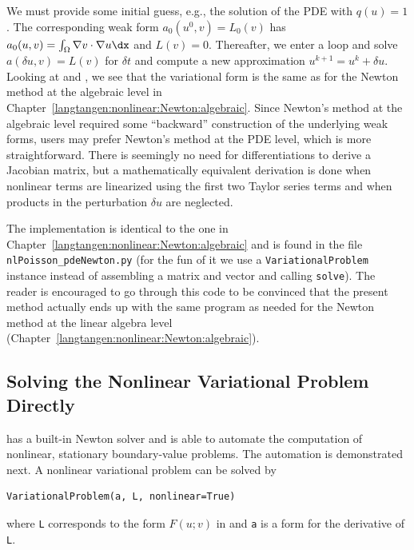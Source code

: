 We must provide some initial guess, e.g., the solution of the
PDE with $q(u)=1$. The corresponding weak form $a_0(u^0,v)=L_0(v)$
has $a_0(u,v)=\int_\Omega\nabla v\cdot\nabla u\dx$
and $L(v)=0$. Thereafter, we enter a loop and solve
$a(\delta u,v)=L(v)$ for $\delta t$ and compute a new approximation
$u^{k+1} = u^k + \delta u$.
Looking at  and
, we see that the variational
form is the same as for the Newton method at the algebraic level
in Chapter~\ref{langtangen:nonlinear:Newton:algebraic}. Since Newton's method
at the algebraic level required some ``backward'' construction of the
underlying weak forms, \fenics{} users may prefer Newton's method at
the PDE level, which is more straightforward.
There is seemingly no need for differentiations to derive
a Jacobian matrix,
but a mathematically equivalent derivation is done when nonlinear terms are
linearized using the first two Taylor series terms and when
products in the perturbation $\delta u$ are neglected.

The implementation is identical to the one in
Chapter~\ref{langtangen:nonlinear:Newton:algebraic} and is found in
the file {\fontsize{12pt}{12pt}\verb!nlPoisson_pdeNewton.py!} (for the fun of it we use
a {\fontsize{12pt}{12pt}\texttt{VariationalProblem}} instance instead of assembling a matrix and
vector and calling {\fontsize{12pt}{12pt}\texttt{solve}}). The reader is encouraged to go
through this code to be convinced that the present method actually
ends up with the same program as needed for the Newton method at
the linear algebra level (Chapter~\ref{langtangen:nonlinear:Newton:algebraic}).


\subsection{Solving the Nonlinear Variational Problem Directly}
\label{langtangen:nonlinear:Newton:auto}

\dolfin{} has a built-in Newton solver and is able to automate the
computation of nonlinear, stationary boundary-value problems.
The automation is demonstrated next. A nonlinear variational
problem  can be solved by
\begin{Verbatim}[fontsize=\fontsize{10pt}{10pt},tabsize=8,baselinestretch=1.05,
fontfamily=tt,xleftmargin=7mm]
VariationalProblem(a, L, nonlinear=True)
\end{Verbatim}
\noindent
where {\fontsize{12pt}{12pt}\texttt{L}} corresponds to the form $F(u;v)$ in
 and {\fontsize{12pt}{12pt}\texttt{a}} is
a form for the derivative of {\fontsize{12pt}{12pt}\texttt{L}}.

